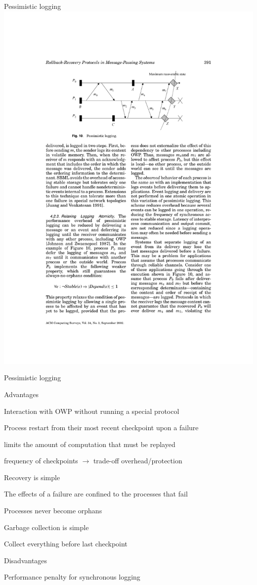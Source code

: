 \begin{frame}{Pessimistic logging}
\includegraphics[width=\textwidth]{pessimistic}
\end{frame}

\begin{frame}{Pessimistic logging}
\BIL
\item \alert{Advantages}
	\BI
	\item Interaction with OWP without running a special protocol
	\item Process restart from their most recent checkpoint upon a failure
	\BI
		\item limits the amount of computation that must be replayed
		\item frequency of checkpoints $\rightarrow$ trade-off overhead/protection
	\EI
	\item Recovery is simple
	\BI
		\item The effects of a failure are confined to the processes that fail
		\item Processes never become orphans
	\EI
	\item Garbage collection is simple
	\BI
		\item Collect everything before last checkpoint
	\EI
	\EI
\item \alert{Disadvantages}
	\BI
	\item Performance penalty for synchronous logging
	\EI
\EIL
\end{frame}

